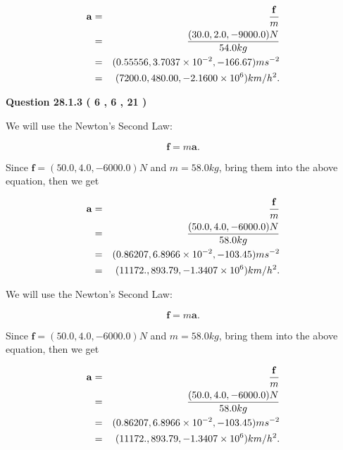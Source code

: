 \documentclass[12pt]{article}
\begin{document}
\begin{eqnarray*}
\mathbf{a}&=&\frac{\mathbf{f}}m  \\
&=&\frac{(
30.0 ,
2.0 ,
-9000.0 )N
}{ %
54.0 kg}  \\
&=&(
0.55556 ,
3.7037 \times 10^{-2},
-166.67
)ms^{-2} \\
&=&(
7200.0 ,
480.00 ,
-2.1600 \times 10^{6}
)km/h^2.
\end{eqnarray*}
 
 
 
  
\vspace{0.2in}
  
{\textbf{\Large{Question
28.1.3 
 (           6 ,           6 ,          21 )
}}}
  
  
 
 
\noindent{}

We will use the Newton's Second Law:
 
\[
\mathbf{f}=m\mathbf{a}.
\]
 
Since $\mathbf{f}=( %
50.0,  %
4.0,  %
-6000.0 )N$
and $m= %
58.0 kg$, bring them into the above equation, then we get
 
\begin{eqnarray*}
\mathbf{a}&=&\frac{\mathbf{f}}m  \\
&=&\frac{(
50.0 ,
4.0 ,
-6000.0 )N
}{ %
58.0 kg}  \\
&=&(
0.86207 ,
6.8966 \times 10^{-2},
-103.45
)ms^{-2} \\
&=&(
11172. ,
893.79 ,
-1.3407 \times 10^{6}
)km/h^2.
\end{eqnarray*}
 
 
 
 
 
\noindent{}

We will use the Newton's Second Law:
 
\[
\mathbf{f}=m\mathbf{a}.
\]
 
Since $\mathbf{f}=( %
50.0,  %
4.0,  %
-6000.0 )N$
and $m= %
58.0 kg$, bring them into the above equation, then we get
 
\begin{eqnarray*}
\mathbf{a}&=&\frac{\mathbf{f}}m  \\
&=&\frac{(
50.0 ,
4.0 ,
-6000.0 )N
}{ %
58.0 kg}  \\
&=&(
0.86207 ,
6.8966 \times 10^{-2},
-103.45
)ms^{-2} \\
&=&(
11172. ,
893.79 ,
-1.3407 \times 10^{6}
)km/h^2.
\end{eqnarray*}
 
\end{document}
